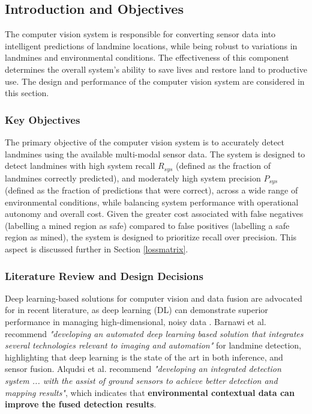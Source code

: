 \subsection{Introduction and Objectives} \label{compvis_intro}

     \noindent The computer vision system is responsible for converting sensor data into intelligent predictions of landmine locations, while being robust to variations in landmines and environmental conditions. The effectiveness of this component determines the overall system’s ability to save lives and restore land to productive use. The design and performance of the computer vision system are considered in this section. 
     
    \subsubsection{Key Objectives}
    
        \noindent The primary objective of the computer vision system is to accurately detect landmines using the available multi-modal sensor data. The system is designed to detect landmines with high system recall $R_{sys}$ (defined as the fraction of landmines correctly predicted), and moderately high system precision $P_{sys}$ (defined as the fraction of predictions that were correct), across a wide range of environmental conditions, while balancing system performance with operational autonomy and overall cost. Given the greater cost associated with false negatives (labelling a mined region as safe) compared to false positives (labelling a safe region as mined), the system is designed to prioritize recall over precision. This aspect is discussed further in Section \ref{lossmatrix}.

    \subsubsection{Literature Review and Design Decisions} 
    
        Deep learning-based solutions for computer vision and data fusion are advocated for in recent literature, as deep learning (DL) can demonstrate superior performance in managing high-dimensional, noisy data \cite{Li2023Robust}. Barnawi et al. \cite{barnawi2022review} recommend \textit{"developing an automated deep learning based solution that integrates several technologies relevant to imaging and automation"} for landmine detection, highlighting that deep learning is the state of the art in both inference, and sensor fusion. Alqudsi et al. \cite{alqudsi2021review} recommend \textit{"developing an integrated detection system ... with the assist of ground sensors to achieve better detection and mapping results"}, which indicates that \textbf{environmental contextual data can improve the fused detection results}.
    
